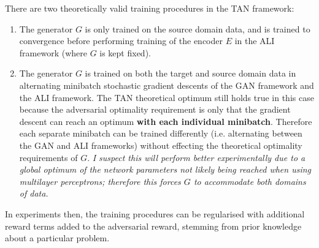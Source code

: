 \documentclass[a4paper,10pt]{article}
\begin{document}
There are two theoretically valid training procedures in the TAN framework:
\begin{enumerate}
\item The generator $G$ is only trained on the source domain data, and is trained to convergence before performing training of the encoder $E$ in the ALI framework (where $G$ is kept fixed).
\item The generator $G$ is trained on both the target and source domain data in alternating minibatch stochastic gradient descents of the GAN framework and the ALI framework. The TAN theoretical optimum still holds true in this case because the adversarial optimality requirement is only that the gradient descent can reach an optimum \textbf{with each individual minibatch}. Therefore each separate minibatch can be trained differently (i.e. alternating between the GAN and ALI frameworks) without effecting the theoretical optimality requirements of $G$. \emph{I suspect this will perform better experimentally due to a global optimum of the network parameters not likely being reached when using multilayer perceptrons; therefore this forces $G$ to accommodate both domains of data.}
\end{enumerate}

In experiments then, the training procedures can be regularised with additional reward terms added to the adversarial reward, stemming from prior knowledge about a particular problem.
\end{document}
